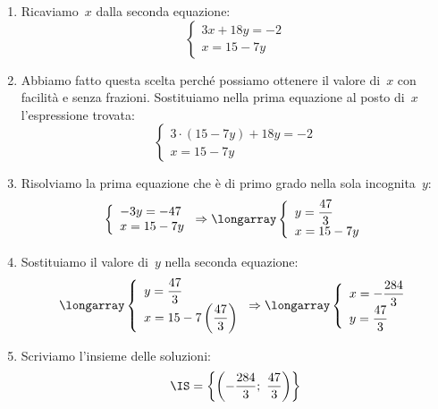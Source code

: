 \begin{exrig}
\begin{esempio}
\begin{enumerate}
\item Ricaviamo~$x$ dalla seconda equazione:
\[\left\{\begin{array}{l}3x+18y=-2\\x=15-7y\end{array}\right.\]

\item Abbiamo fatto questa scelta perché possiamo ottenere il valore di~$x$
con facilità e senza frazioni. Sostituiamo nella prima equazione al posto di~$x$
l'espressione trovata:
\[\left\{\begin{array}{l}
          3\cdot(15-7y)+18y=-2\\
          x=15-7y
          \end{array}\right.
\]
\item Risolviamo la prima equazione che è di primo grado nella sola
incognita~$y$:
\[\left\{\begin{array}{l}
          -3y=-47\\
          x=15-7y
          \end{array}\right.
\Rightarrow\longarray\left\{\begin{array}{l}
          y=\dfrac{47}{3}\\
          x=15-7y
         \end{array}\right.\]
\item Sostituiamo il valore di~$y$ nella seconda equazione:
\[\longarray\left\{\begin{array}{l}
          y=\dfrac{47}{3}\\
          x=15-7\left(\dfrac{47}{3}\right)
          \end{array}\right.
\Rightarrow \longarray\left\{\begin{array}{l}x=-\dfrac{284}{3}\\
 y=\dfrac{47}{3}\end{array}\right.\]
\item Scriviamo l'insieme delle soluzioni:
\[\IS=\left\{\left(-\frac{284}{3};~\frac{47}{3}\right)\right\}\]
\end{enumerate}


\end{esempio}
\end{exrig}
